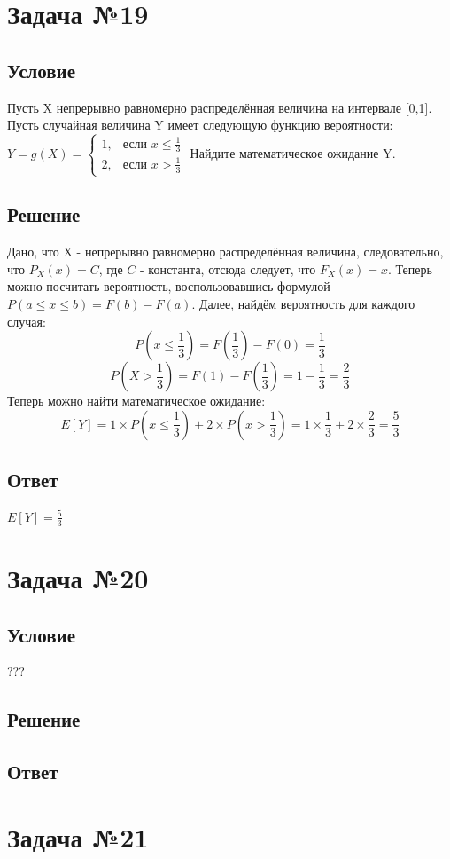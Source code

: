 \documentclass{article}
\begin{document}
\section*{Задача №19}
\subsection*{Условие}
 Пусть X непрерывно равномерно распределённая величина на интервале
[0,1]. Пусть случайная величина Y имеет следующую функцию вероятности:
\(Y = g(X) = \begin{cases}
  1, & \text{если } x \leq \frac{1}{3} \\
  2, & \text{если } x > \frac{1}{3}
\end{cases}\) Найдите математическое ожидание Y. 
\subsection*{Решение}
Дано, что X - непрерывно равномерно распределённая величина, следовательно, что $P_X(x) = C$, где $C$ - константа, отсюда следует, что $F_X(x) = x $.
Теперь можно посчитать вероятность, воспользовавшись формулой $P(a\le x \le b) = F(b) - F(a)$. Далее, найдём вероятность для каждого случая:
\[
    P(x \le \frac{1}{3}) = F(\frac{1}{3}) - F(0) = \frac{1}{3} 
\]
\[
    P(X > \frac{1}{3}) = F(1) - F(\frac{1}{3}) = 1 - \frac{1}{3} = \frac{2}{3}
\]
Теперь можно найти математическое ожидание:
\[
    E[Y] = 1 \times P(x \le \frac{1}{3}) + 2 \times P(x > \frac{1}{3}) = 1 \times \frac{1}{3} + 2 \times \frac{2}{3} = \frac{5}{3}
\]
\subsection*{Ответ}
$E[Y] = \frac{5}{3}$
\section*{Задача №20}
\subsection*{Условие}
 ???
\subsection*{Решение}
\subsection*{Ответ}

\section*{Задача №21}
\end{document}
